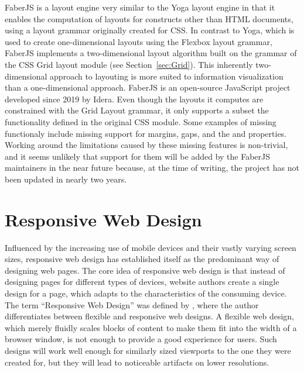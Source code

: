 FaberJS \parencite{FaberJS} is a layout engine very similar to the
Yoga layout engine in that it enables the computation of layouts for
constructs other than HTML documents, using a layout grammar
originally created for CSS. In contrast to Yoga, which is used to
create one-dimensional layouts using the Flexbox layout grammar,
FaberJS implements a two-dimensional layout algorithm built on the
grammar of the CSS Grid layout module (see Section~\ref{sec:Grid}).
This inherently two-dimensional approach to layouting is more suited
to information visualization than a one-dimensional approach. FaberJS
is an open-source JavaScript project developed since 2019 by
Idera. Even though the layouts it computes are constrained with the
Grid Layout grammar, it only supports a subset the functionality
defined in the original CSS module. Some examples of missing
functionaly include missing support for margins, gaps, and the
 and  properties. Working
around the limitations caused by these missing features is
non-trivial, and it seems unlikely that support for them will be added
by the FaberJS maintainers in the near future because, at the time of
writing, the project has not been updated in nearly two years.






\section{Responsive Web Design}
\label{sec:RWD}


Influenced by the increasing use of mobile devices and their vastly
varying screen sizes, responsive web design has established itself as
the predominant way of designing web pages. The core idea of
responsive web design is that instead of designing pages for different
types of devices, website authors create a single design for a page,
which adapts to the characteristics of the consuming device. The term
\enquote{Responsive Web Design} was defined by
\textcite{Marcotte-ALA-RWD}, where the author differentiates between
flexible and responsive web designs. A flexible web design, which
merely fluidly scales blocks of content to make them fit into the
width of a browser window, is not enough to provide a good experience
for users. Such designs will work well enough for similarly sized
viewports to the one they were created for, but they will lead to
noticeable artifacts on lower resolutions.

